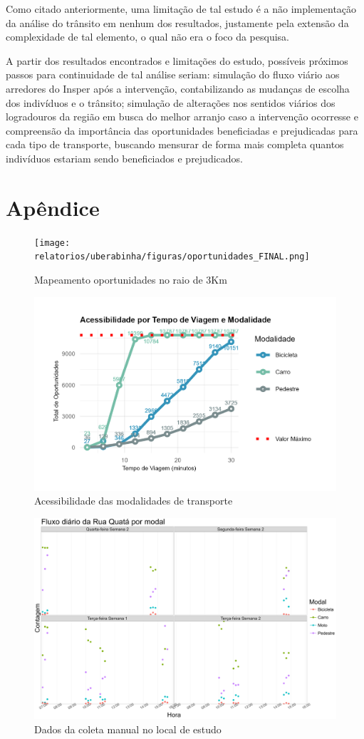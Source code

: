 Como citado anteriormente, uma limitação de tal estudo é a não implementação da análise do trânsito em nenhum dos resultados, justamente pela extensão da complexidade de tal elemento, o qual não era o foco da pesquisa.

A partir dos resultados encontrados e limitações do estudo, possíveis próximos passos para continuidade de tal análise seriam: simulação do fluxo viário aos arredores do Insper após a intervenção, contabilizando as mudanças de escolha dos indivíduos e o trânsito; simulação de alterações nos sentidos viários dos logradouros da região em busca do melhor arranjo caso a intervenção ocorresse e compreensão da importância das oportunidades beneficiadas e prejudicadas para cada tipo de transporte, buscando mensurar de forma mais completa quantos indivíduos estariam sendo beneficiados e prejudicados.



\printbibliography[keyword = uberabinha]

\section{Apêndice}

\begin{figure}[h]
    \centering
    \caption{Mapeamento oportunidades no raio de 3Km}
    \texttt{[image: relatorios/uberabinha/figuras/oportunidades\_FINAL.png]}
\end{figure}



\begin{figure}[h]
    \centering
    \caption{Acessibilidade das modalidades de transporte}
    \includegraphics[width = 0.7\linewidth]{relatorios/uberabinha/figuras/acessibilidade_por_modal.png}
\end{figure}

\begin{figure}[h]
    \centering
    \caption{Dados da coleta manual no local de estudo}
    \includegraphics[width = 0.7\linewidth]{relatorios/uberabinha/figuras/Teste.png}
\end{figure}


